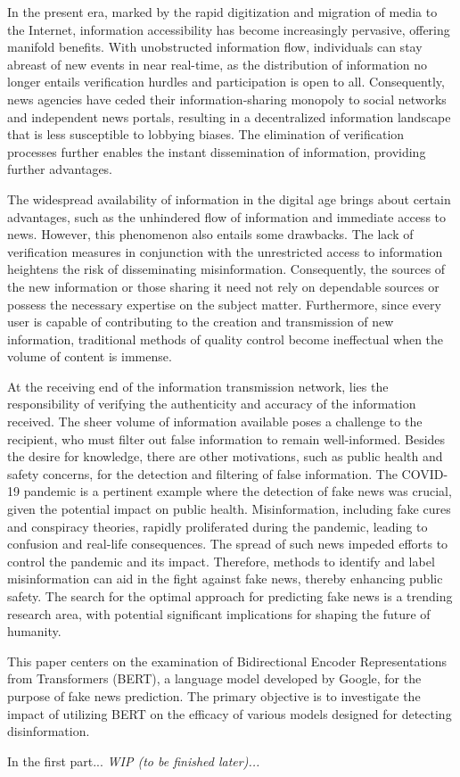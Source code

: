 In the present era, marked by the rapid digitization and migration of media to the Internet, information accessibility has become increasingly pervasive, offering manifold benefits. With unobstructed information flow, individuals can stay abreast of new events in near real-time, as the distribution of information no longer entails verification hurdles and participation is open to all. Consequently, news agencies have ceded their information-sharing monopoly to social networks and independent news portals, resulting in a decentralized information landscape that is less susceptible to lobbying biases. The elimination of verification processes further enables the instant dissemination of information, providing further advantages.

The widespread availability of information in the digital age brings about certain advantages, such as the unhindered flow of information and immediate access to news. However, this phenomenon also entails some drawbacks. The lack of verification measures in conjunction with the unrestricted access to information heightens the risk of disseminating misinformation. Consequently, the sources of the new information or those sharing it need not rely on dependable sources or possess the necessary expertise on the subject matter. Furthermore, since every user is capable of contributing to the creation and transmission of new information, traditional methods of quality control become ineffectual when the volume of content is immense.

At the receiving end of the information transmission network, lies the responsibility of verifying the authenticity and accuracy of the information received. The sheer volume of information available poses a challenge to the recipient, who must filter out false information to remain well-informed. Besides the desire for knowledge, there are other motivations, such as public health and safety concerns, for the detection and filtering of false information. The COVID-19 pandemic is a pertinent example where the detection of fake news was crucial, given the potential impact on public health. Misinformation, including fake cures and conspiracy theories, rapidly proliferated during the pandemic, leading to confusion and real-life consequences. The spread of such news impeded efforts to control the pandemic and its impact. Therefore, methods to identify and label misinformation can aid in the fight against fake news, thereby enhancing public safety. The search for the optimal approach for predicting fake news is a trending research area, with potential significant implications for shaping the future of humanity.

This paper centers on the examination of Bidirectional Encoder Representations from Transformers (BERT), a language model developed by Google, for the purpose of fake news prediction. The primary objective is to investigate the impact of utilizing BERT on the efficacy of various models designed for detecting disinformation.

In the first part... \textit{WIP (to be finished later)...}